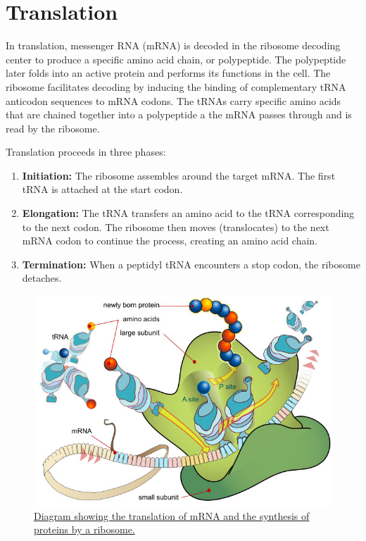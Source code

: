 \hypertarget{translation}{%
\section{Translation}\label{translation}}

In translation, messenger RNA (mRNA) is decoded in the ribosome decoding center to produce a specific amino acid chain, or polypeptide. The polypeptide later folds into an active protein and performs its functions in the cell. The ribosome facilitates decoding by inducing the binding of complementary tRNA anticodon sequences to mRNA codons. The tRNAs carry specific amino acids that are chained together into a polypeptide a the mRNA passes through and is read by the ribosome.

Translation proceeds in three phases:

\begin{enumerate}
\def\labelenumi{\arabic{enumi}.}
\tightlist
\item
  \textbf{Initiation:} The ribosome assembles around the target mRNA. The first tRNA is attached at the start codon.
\item
  \textbf{Elongation:} The tRNA transfers an amino acid to the tRNA corresponding to the next codon. The ribosome then moves (translocates) to the next mRNA codon to continue the process, creating an amino acid chain.
\item
  \textbf{Termination:} When a peptidyl tRNA encounters a stop codon, the ribosome detaches.
\end{enumerate}



\begin{figure}

{\centering \includegraphics[width=0.7\linewidth]{./figures/translation/Ribosome_mRNA_translation_en} 

}

\caption{\href{https://commons.wikimedia.org/wiki/File:Ribosome_mRNA_translation_en.svg}{Diagram showing the translation of mRNA and the synthesis of proteins by a ribosome.}}\label{fig:translation}
\end{figure}

